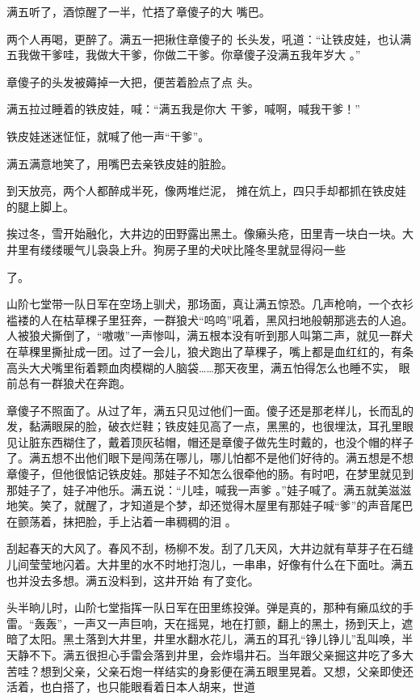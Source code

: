 \documentclass{article}
\begin{document}
满五听了，酒惊醒了一半，忙捂了章傻子的大
嘴巴。 

两个人再喝，更醉了。满五一把揪住章傻子的
\newpage
长头发，吼道：“让铁皮娃，也认满五我做干爹哇，我做大干爹，你做二干爹。你章傻子没满五我年岁大
。” 

章傻子的头发被薅掉一大把，便苦着脸点了点
头。 

满五拉过睡着的铁皮娃，喊：“满五我是你大
干爹，喊啊，喊我干爹！” 


铁皮娃迷迷怔怔，就喊了他一声“干爹”。 

满五满意地笑了，用嘴巴去亲铁皮娃的脏脸。
 

到天放亮，两个人都醉成半死，像两堆烂泥，
摊在炕上，四只手却都抓在铁皮娃的腿上脚上。 

挨过冬，雪开始融化，大井边的田野露出黑土。像癞头疮，田里青一块白一块。大井里有缕缕暖气儿袅袅上升。狗房子里的犬吠比隆冬里就显得闷一些
\newpage

了。 

山阶七堂带一队日军在空场上驯犬，那场面，真让满五惊恐。几声枪响，一个衣衫褴褛的人在枯草稞子里狂奔，一群狼犬“呜呜”吼着，黑风扫地般朝那逃去的人追。人被狼犬撕倒了，“嗷嗷”一声惨叫，满五根本没有听到那人叫第二声，就见一群犬在草稞里撕扯成一团。过了一会儿，狼犬跑出了草稞子，嘴上都是血红红的，有条高头大犬嘴里衔着颗血肉模糊的人脑袋……那天夜里，满五怕得怎么也睡不实，
眼前总有一群狼犬在奔跑。 

章傻子不照面了。从过了年，满五只见过他们一面。傻子还是那老样儿，长而乱的发，黏满眼屎的脸，破衣烂鞋；铁皮娃见高了一点，黑黑的，也很埋汰，耳孔里眼见让脏东西糊住了，戴着顶灰毡帽，帽还是章傻子做先生时戴的，也没个帽的样子了。满五想不出他们眼下是闯荡在哪儿，哪儿怕都不是他们好待的。满五想是不想章傻子，但他很惦记铁皮娃。那娃子不知怎么很牵他的肠。有时吧，在梦里就见到那娃子了，娃子冲他乐。满五说：“儿哇，喊我一声爹
\newpage
。”娃子喊了。满五就美滋滋地笑。笑了，就醒了，才知道是个梦，却还觉得木屋里有那娃子喊“爹”的声音尾巴在颤荡着，抹把脸，手上沾着一串稠稠的泪
。 

刮起春天的大风了。春风不刮，杨柳不发。刮了几天风，大井边就有草芽子在石缝儿间莹莹地闪着。大井里的水不时地打泡儿，一串串，好像有什么在下面吐。满五也并没去多想。满五没料到，这井开始
有了变化。 

头半晌儿时，山阶七堂指挥一队日军在田里练投弹。弹是真的，那种有癞瓜纹的手雷。“轰轰”，一声又一声巨响，天在摇晃，地在打颤，翻上的黑土，扬到天上，遮暗了太阳。黑土落到大井里，井里水翻水花儿，满五的耳孔“铮儿铮儿”乱叫唤，半天静不下。满五很担心手雷会落到井里，会炸塌井石。当年跟父亲掘这井吃了多大苦哇？想到父亲，父亲石炮一样结实的身影便在满五眼里晃着。又想，父亲即使还活着，也白搭了，也只能眼看着日本人胡来，世道
\end{document}
